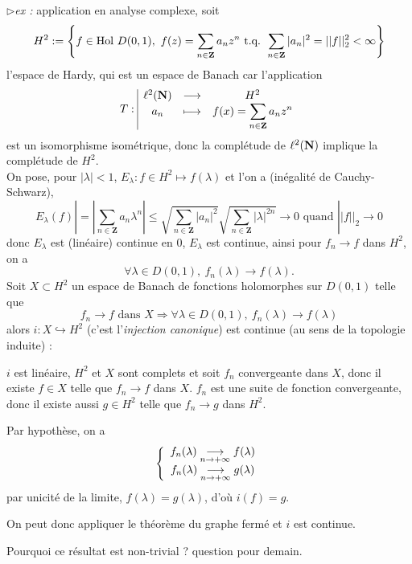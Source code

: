 \documentclass[a4paper,11pt, twoside]{article}
\begin{document}
$\triangleright$\emph{ex :} application en analyse complexe, soit 
$$H^2:=\left\{f\in\mathrm{Hol}\ D(0,1),\ f(z)=\sum_{n\in\mathbf Z}a_n z^n \tq \sum_{n\in\mathbf Z}|a_n|^2=||f||_2^2<\infty\right\}$$
l'espace de Hardy, qui est un espace de Banach car l'application
$$T:\begin{array}{|ccc}
  \ell^2(\mathbf N)&\longrightarrow&H^2\\
   a_n&\longmapsto&f(x)=\displaystyle\sum_{n\in\mathbf Z}a_n z^n
\end{array}$$
est un isomorphisme isométrique, donc la complétude de $ \ell^2(\mathbf N)$ implique la complétude de $H^2$.\\

On pose, pour $|\lambda|<1$, $E_\lambda:f\in H^2\longmapsto f(\lambda)$ et l'on a (inégalité de Cauchy-Schwarz),
$$E_{\lambda}(f)|=\left|\sum_{n\in\mathbf Z}a_n\lambda^n\right|\leqslant \sqrt{\sum_{n\in\mathbf Z}|a_n|^2}\sqrt{\sum_{n\in\mathbf Z}|\lambda|^{2n}}\longrightarrow 0\text{ quand }||f||_2\to 0$$
donc $E_\lambda$ est (linéaire) continue en 0, $E_\lambda$ est continue, ainsi pour $f_n\to f$ dans $H^2$, on a 
$$\forall \lambda\in D(0,1),\ f_n(\lambda)\longrightarrow f(\lambda).$$
Soit $X\subset H^2$ un espace de Banach de fonctions holomorphes sur $D(0,1)$ telle que 
$$f_n\longrightarrow f\text{ dans }X\Rightarrow\forall \lambda\in D(0,1),\ f_n(\lambda)\longrightarrow f(\lambda)$$
alors $i:X\hookrightarrow H^2$ (c'est l'\emph{injection canonique}) est continue (au sens de la topologie induite) :

\begin{Proof}
  $i$ est linéaire, $H^2$ et $X$ sont complets et soit $f_n$ convergeante dans $X$, donc il existe $f\in X$ telle que $f_n\longrightarrow f$ dans $X$. $f_n$ est une suite de fonction convergeante, donc il existe aussi $g\in H^2$ telle que $f_n\longrightarrow g$ dans $H^2$.

  Par hypothèse, on a 
  $$\left\{\begin{array}{c}
    f_n(\lambda)\underset{n\to+\infty}{\longrightarrow} f(\lambda)\\
    f_n(\lambda)\underset{n\to+\infty}{\longrightarrow} g(\lambda)
  \end{array}\right.$$
  par unicité de la limite, $f(\lambda)=g(\lambda)$, d'où $i(f)=g$.

  On peut donc appliquer le théorème du graphe fermé et $i$ est continue.
\end{Proof}


Pourquoi ce résultat est non-trivial ? question pour demain.
\end{document}
